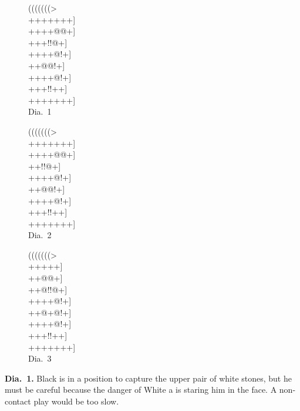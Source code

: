 \documentclass[royalvopaper,10pt,twoside,onecolumn,draft]{memoir}
\begin{document}
\begin{figure}[ht]
    \begin{minipage}[c]{0.33\linewidth}
        \centering    
        {\gnos%
        (((((((>\\
        +++++++]\\
        ++++@@+]\\
        +++!!@+]\\
        ++++@!+]\\
        ++@@!+]\\
        ++++@!+]\\
        +++!!++]\\
        +++++++]\\
        }
        Dia.\ 1
    \end{minipage}%
    \begin{minipage}[c]{0.33\linewidth}
        \centering    
        {\gnos%
        (((((((>\\
        +++++++]\\
        ++++@@+]\\
        ++{\gnosb{}}!!@+]\\
        ++++@!+]\\
        ++@@!+]\\
        ++++@!+]\\
        +++!!++]\\
        +++++++]\\
        }
        Dia.\ 2
    \end{minipage}%
    \begin{minipage}[c]{0.33\linewidth}
        \centering    
        {\gnos%
        (((((((>\\
        ++{\gnosb{}}{\gnosw{}}+++]\\
        ++{\gnosb{}}{\gnosw{}}@@+]\\
        ++@!!@+]\\
        ++++@!+]\\
        ++@+@!+]\\
        ++++@!+]\\
        +++!!++]\\
        +++++++]\\
        }
        Dia.\ 3
    \end{minipage}%
\end{figure}


\textbf{Dia.\ 1.} Black is in a position to capture the upper pair of white stones,
but he must be careful because the danger of White a is staring him in
the face. A non-contact play would be too slow.
\end{document}
